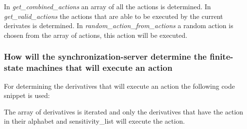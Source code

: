 \begin{Shaded}
\begin{Highlighting}[]
\NormalTok{\{}

\NormalTok{    \{}
\NormalTok{        \{}
            \NormalTok{;}
\NormalTok{        \}}
\NormalTok{    \}}

\NormalTok{\}}
\end{Highlighting}
\end{Shaded}

In \emph{get\_combined\_actions} an array of all the actions is
determined. In \emph{get\_valid\_actions} the actions that are able to
be executed by the current derivates is determined. In
\emph{random\_action\_from\_actions} a random action is chosen from the
array of actions, this action will be executed.

\hypertarget{how-will-the-synchronization-server-determine-the-finite-state-machines-that-will-execute-an-action}{%
\subsubsection{How will the synchronization-server determine the
finite-state machines that will execute an
action}\label{how-will-the-synchronization-server-determine-the-finite-state-machines-that-will-execute-an-action}}

For determining the derivatives that will execute an action the
following code snippet is used:

\begin{Shaded}
\begin{Highlighting}[]
\NormalTok{\{}
    \NormalTok{;}

\NormalTok{    \{}
\NormalTok{        \{}
\NormalTok{        \}}
\NormalTok{    \}}
\NormalTok{\}}
\end{Highlighting}
\end{Shaded}

The array of derivatives is iterated and only the derivatives that have
the action in their alphabet and sensitivity\_list will execute the
action.
